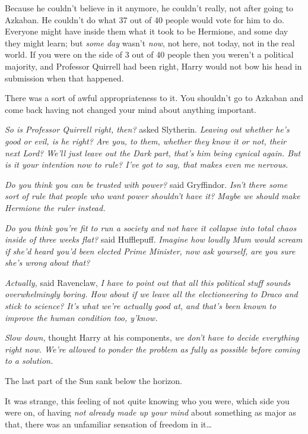 Because he couldn't believe in it anymore, he couldn't really, not after going to Azkaban. He couldn't do what 37 out of 40 people would vote for him to do. Everyone might have inside them what it took to be Hermione, and some day they might learn; but \emph{some day} wasn't \emph{now}, not here, not today, not in the real world. If you were on the side of 3 out of 40 people then you weren't a political majority, and Professor Quirrell had been right, Harry would not bow his head in submission when that happened.

There was a sort of awful appropriateness to it. You shouldn't go to Azkaban and come back having not changed your mind about anything important.

\emph{So is Professor Quirrell right, then?} asked Slytherin. \emph{Leaving out whether he's good or evil, is he \emph{right}? Are you, to them, whether they know it or not, their next Lord? We'll just leave out the Dark part, that's him being cynical again. But is it your intention now to rule? I've got to say, that makes even \emph{me} nervous.}

\emph{Do you think you can be trusted with power?} said Gryffindor. \emph{Isn't there some sort of rule that people who want power shouldn't have it? Maybe we should make Hermione the ruler instead.}

\emph{Do you think you're fit to run a society and not have it collapse into total chaos inside of three weeks flat?} said Hufflepuff. \emph{Imagine how loudly Mum would scream if she'd heard you'd been elected Prime Minister, now ask yourself, are you sure she's wrong about that?}

\emph{Actually,} said Ravenclaw, \emph{I have to point out that all this political stuff sounds overwhelmingly boring. How about if we leave all the electioneering to Draco and stick to science? It's what we're actually good at, and that's been known to improve the human condition too, y'know.}

\emph{Slow down,} thought Harry at his components, \emph{we don't have to decide everything right now. We're allowed to ponder the problem as fully as possible before coming to a solution.}

The last part of the Sun sank below the horizon.

It was strange, this feeling of not quite knowing who you were, which side you were on, of having \emph{not already made up your mind} about something as major as that, there was an unfamiliar sensation of freedom in it{\ldots}

